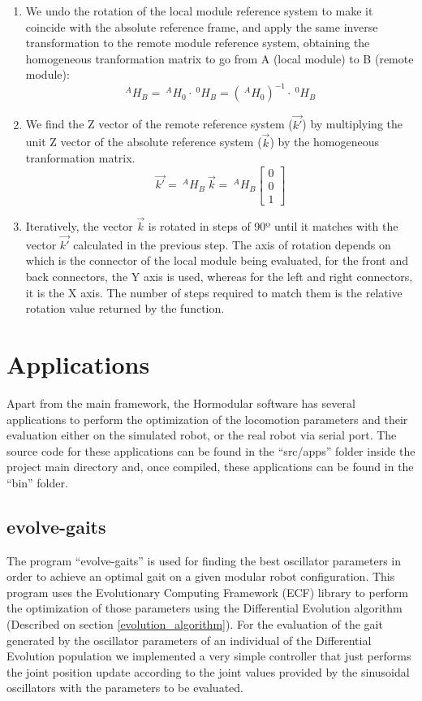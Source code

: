 \begin{enumerate}
	 \item We undo the rotation of the local module reference system to make it coincide with the absolute reference frame, and apply the same inverse transformation to the remote module reference system, obtaining the homogeneous tranformation matrix to go from A (local module) to B (remote module):
	 \[  ^{A}H_B = ~^{A}H_0 \cdot ~^{0}H_B = (~^{A}H_0)^{-1} \cdot ~^{0}H_B  \]
	 
	 \item We find the Z vector of the remote reference system ($ \vec{k'}$) by multiplying the unit Z vector of the absolute reference system ($ \vec{k}$) by the homogeneous tranformation matrix.
	 \[ \vec{k'} = ~^{A}H_B ~ \vec{k} = ~^{A}H_B \begin{bmatrix} 0\\ 0\\ 1 \end{bmatrix}\]
	 
	 \item Iteratively, the vector $\vec{k}$ is rotated in steps of 90º until it matches with the vector $\vec{k'}$ calculated in the previous step. The axis of rotation depends on which is the connector of the local module being evaluated, for the front and back connectors, the Y axis is used, whereas for the left and right connectors, it is the X axis. The number of steps required to match them is the relative rotation value returned by the function.
\end{enumerate}


\section{Applications}
\label{software_apps}

Apart from the main framework, the Hormodular software has several applications to perform the optimization of the locomotion parameters and their evaluation either on the simulated robot, or the real robot via serial port. The source code for these applications can be found in the ``src/apps'' folder inside the project main directory and, once compiled, these applications can be found in the ``bin'' folder.

\subsection{evolve-gaits}
\label{software_evolve-gaits}
The program ``evolve-gaits'' is used for finding the best oscillator parameters in order to achieve an optimal gait on a given modular robot configuration. This program uses the Evolutionary Computing Framework (ECF) library to perform the optimization of those parameters using the Differential Evolution algorithm (Described on section \ref{evolution_algorithm}). For the evaluation of the gait generated by the oscillator parameters of an individual of the Differential Evolution population we implemented a very simple controller that just performs the joint position update according to the joint values provided by the sinusoidal oscillators with the parameters to be evaluated.\\

